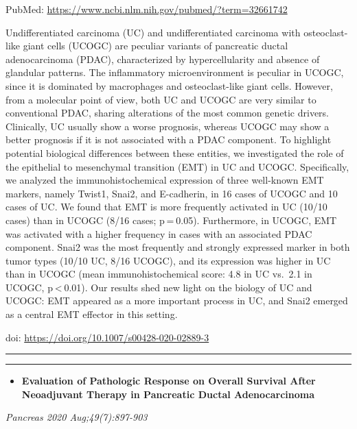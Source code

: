 \documentclass[
]{article}
\providecommand{\tightlist}{%
  \setlength{\itemsep}{0pt}\setlength{\parskip}{0pt}}
\begin{document}
PubMed: \url{https://www.ncbi.nlm.nih.gov/pubmed/?term=32661742}

Undifferentiated carcinoma (UC) and undifferentiated carcinoma with
osteoclast-like giant cells (UCOGC) are peculiar variants of pancreatic
ductal adenocarcinoma (PDAC), characterized by hypercellularity and
absence of glandular patterns. The inflammatory microenvironment is
peculiar in UCOGC, since it is dominated by macrophages and
osteoclast-like giant cells. However, from a molecular point of view,
both UC and UCOGC are very similar to conventional PDAC, sharing
alterations of the most common genetic drivers. Clinically, UC usually
show a worse prognosis, whereas UCOGC may show a better prognosis if it
is not associated with a PDAC component. To highlight potential
biological differences between these entities, we investigated the role
of the epithelial to mesenchymal transition (EMT) in UC and UCOGC.
Specifically, we analyzed the immunohistochemical expression of three
well-known EMT markers, namely Twist1, Snai2, and E-cadherin, in 16
cases of UCOGC and 10 cases of UC. We found that EMT is more frequently
activated in UC (10/10 cases) than in UCOGC (8/16 cases; p = 0.05).
Furthermore, in UCOGC, EMT was activated with a higher frequency in
cases with an associated PDAC component. Snai2 was the most frequently
and strongly expressed marker in both tumor types (10/10 UC, 8/16
UCOGC), and its expression was higher in UC than in UCOGC (mean
immunohistochemical score: 4.8 in UC vs.~2.1 in UCOGC,
p \textless{} 0.01). Our results shed new light on the biology of UC and
UCOGC: EMT appeared as a more important process in UC, and Snai2 emerged
as a central EMT effector in this setting.

doi: \url{https://doi.org/10.1007/s00428-020-02889-3}

\begin{center}\rule{0.5\linewidth}{0.5pt}\end{center}

\begin{center}\rule{0.5\linewidth}{0.5pt}\end{center}

\begin{itemize}
\tightlist
\item
  \textbf{Evaluation of Pathologic Response on Overall Survival After
  Neoadjuvant Therapy in Pancreatic Ductal Adenocarcinoma}
\end{itemize}

\emph{Pancreas 2020 Aug;49(7):897-903}
\end{document}
